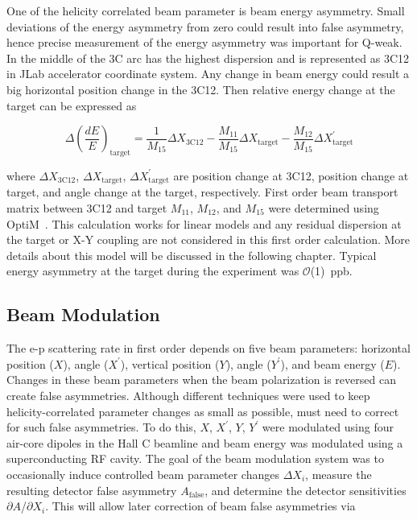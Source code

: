 One of the helicity correlated beam parameter is beam energy asymmetry. Small 
deviations of the energy asymmetry from zero 
could result into false asymmetry, hence precise measurement of the energy asymmetry was important for Q-weak. In the middle of the 3C arc has the highest dispersion and is represented as 3C12 in JLab accelerator coordinate system. Any change in beam energy could result a big horizontal position change in the 3C12. Then relative energy change at the target can be expressed as

\begin{equation} \label{equ:energy2}
\Delta\left(\frac{dE}{E} \right)_{\textrm{target}} = \frac{1}{M_{15}}\Delta X_{\textrm{3C12}} - \frac{M_{11}}{M_{15}}\Delta X_{\textrm{target}} - \frac{M_{12}}{M_{15}}\Delta X^{\prime}_{\textrm{target}}
\end{equation}

\noindent
where $\Delta X_{\textrm{3C12}}$, $\Delta X_{\textrm{target}}$, $\Delta X^{\prime}_{\textrm{target}}$ are position change at 3C12, position change at target, and angle change at the target, respectively. First order beam transport matrix between 3C12 and target $M_{11}$, $M_{12}$, and $M_{15}$ were determined using OptiM~\cite{OPTIM}. This calculation works for linear models and any residual dispersion at the target or X-Y coupling are not considered in this first order calculation. More details about this model will be discussed in the following chapter. Typical energy asymmetry at the target during the experiment was $\mathcal{O}$(1)~ppb. 

\subsection{Beam Modulation}%
\label{Beam Modulation Experiment}

The e-p scattering rate in first order depends on five beam parameters: horizontal position ($X$), angle ($X^\prime$), vertical position ($Y$), angle ($Y^\prime$), and beam energy ($E$). Changes in these beam parameters when the beam polarization is reversed can create false asymmetries. Although different techniques were used to keep helicity-correlated parameter changes as small as possible, must need to correct for such false asymmetries. To do this, $X$, $X^{\prime}$, $Y$, $Y^{\prime}$ were modulated using four air-core dipoles in the Hall C beamline and beam energy was modulated using a superconducting RF cavity. The goal of the beam modulation system was to occasionally induce controlled beam parameter changes $\Delta X_{i}$, measure the resulting detector false asymmetry $A_{\textrm{false}}$, and determine the detector sensitivities $\partial A$/$\partial X_{i}$. This will allow later correction of beam false asymmetries via 

